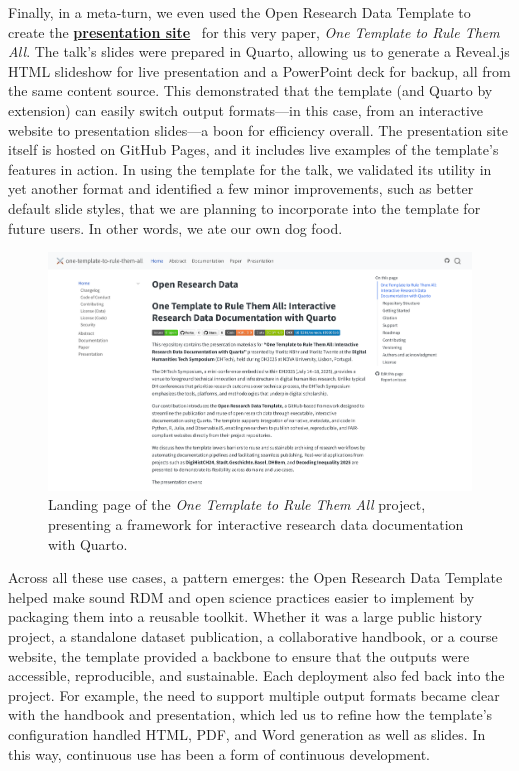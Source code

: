 \documentclass[final]{anthology-ch} %
\begin{document}
Finally, in a meta-turn, we even used the Open Research Data Template to create the \href{https://maehr.github.io/one-template-to-rule-them-all/}{\textbf{presentation site}}~\cite{mahr2025h} for this very paper, \emph{One Template to Rule Them All}. The talk's slides were prepared in Quarto, allowing us to generate a Reveal.js HTML slideshow for live presentation and a PowerPoint deck for backup, all from the same content source. This demonstrated that the template (and Quarto by extension) can easily switch output formats---in this case, from an interactive website to presentation slides---a boon for efficiency overall. The presentation site itself is hosted on GitHub Pages, and it includes live examples of the template's features in action. In using the template for the talk, we validated its utility in yet another format and identified a few minor improvements, such as better default slide styles, that we are planning to incorporate into the template for future users. In other words, we ate our own dog food.

\begin{figure}[t!]
  \centering
  \includegraphics[width=0.9\linewidth]{figures/one_template_to_rule_them_all.png}
  \caption{Landing page of the \emph{One Template to Rule Them All} project, presenting a framework for interactive research data documentation with Quarto.}
  \label{fig-one-template}
\end{figure}

Across all these use cases, a pattern emerges: the Open Research Data Template helped make sound RDM and open science practices easier to implement by packaging them into a reusable toolkit. Whether it was a large public history project, a standalone dataset publication, a collaborative handbook, or a course website, the template provided a backbone to ensure that the outputs were accessible, reproducible, and sustainable. Each deployment also fed back into the project. For example, the need to support multiple output formats became clear with the handbook and presentation, which led us to refine how the template's configuration handled HTML, PDF, and Word generation as well as slides. In this way, continuous use has been a form of continuous development.
\end{document}
